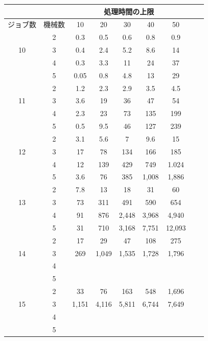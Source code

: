 \documentclass[12pt]{optlab-bachelor}
\begin{document}
\begin{table}[htb]
  \begin{center}
    \begin{tabular}{|c|c|c|c|c|c|c|c|c|} \hline
      &  & \multicolumn{5}{c|}{処理時間の上限} \\ \hline
      ジョブ数 & 機械数& 10 & 20 & 30 & 40 & 50 \\ \hline \hline
      & 2 & 0.3 & 0.5 & 0.6 & 0.8 & 0.9   \\ \cline{2-7}
      10 & 3 & 0.4 & 2.4 & 5.2 & 8.6 & 14   \\ \cline{2-7}
      & 4 & 0.3 & 3.3 & 11 & 24 & 37   \\ \cline{2-7}
      & 5 & 0.05 & 0.8 & 4.8 & 13 & 29   \\ \hline \hline

      & 2 & 1.2 & 2.3 & 2.9 & 3.5 & 4.5   \\ \cline{2-7}
      11 & 3 & 3.6 & 19 & 36 & 47  & 54 \\ \cline{2-7}
      & 4 & 2.3 & 23 & 73 & 135 & 199   \\ \cline{2-7}
      & 5 & 0.5 & 9.5 & 46 & 127 & 239   \\ \hline \hline

      & 2 & 3.1 & 5.6 & 7 & 9.6 & 15   \\ \cline{2-7}
      12 & 3 & 17 & 78 & 134 & 166 & 185 \\ \cline{2-7}
      & 4 & 12 & 139 & 429 & 749 & 1.024   \\ \cline{2-7}
      & 5 & 3.6 & 76 & 385 & 1,008 & 1,886  \\ \hline \hline

      & 2 & 7.8 & 13 & 18 & 31 & 60 \\ \cline{2-7}
      13 & 3 & 73 & 311 & 491 & 590 & 654 \\ \cline{2-7}
      & 4 & 91 & 876 & 2,448 & 3,968 & 4,940 \\ \cline{2-7}
      & 5 & 31 & 710 & 3,168 & 7,751 & 12,093 \\ \hline \hline

      & 2 & 17 & 29 & 47 & 108 & 275 \\ \cline{2-7}
      14 & 3 & 269 & 1,049 & 1,535 & 1,728 & 1,796 \\ \cline{2-7}
      & 4 &  &  &  &  &  \\ \cline{2-7}
      & 5 &  &  &  &  &  \\ \hline \hline

      & 2 & 33 & 76 & 163 & 548 & 1,696 \\ \cline{2-7}
      15 & 3 & 1,151 & 4,116 & 5,811 & 6,744 & 7,649 \\ \cline{2-7}
      & 4 &  &  &  &  &  \\ \cline{2-7}
      & 5 &  &  &  &  &  \\ \hline \hline


\end{tabular}
\end{center}
\end{table}
\end{document}
